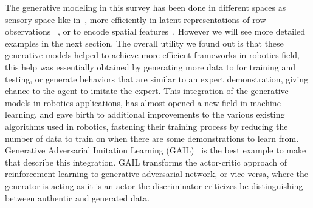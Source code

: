 The generative modeling in this survey has been done in different spaces as sensory space like in~\cite{nair2018visual}, more efficiently in latent representations of row observations~\cite{fujimoto2018addressing} , or to encode spatial features~\cite{finn2016deep}. However we will see more detailed examples in the next section. The overall utility we found out is that these generative models helped to achieve more efficient frameworks in robotics field, this help was essentially obtained by generating more data to for training and testing, or generate behaviors that are similar to an expert demonstration, giving chance to the agent to imitate the expert. This integration of the generative models in robotics applications, has almost opened a new field in machine learning, and gave birth to additional improvements to the various existing algorithms used in robotics, fastening their training process by reducing the number of data to train on when there are some demonstrations to learn from. Generative Adversarial Imitation Learning (GAIL)~\cite{DBLP:journals/corr/HoE16} is the best example to make that describe this integration. GAIL transforms the actor-critic approach of reinforcement learning to generative adversarial network, or vice versa, where the generator is acting as it is an actor the discriminator criticizes be distinguishing between authentic and generated data.

\clearpage{\pagestyle{empty}\cleardoublepage}